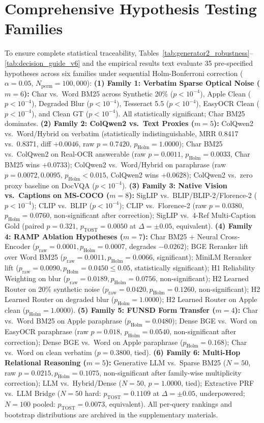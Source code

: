 \section{Comprehensive Hypothesis Testing Families}
\label{sec:appendix_holm}
{\scriptsize To ensure complete statistical traceability, Tables~\ref{tab:generator2_robustness}--\ref{tab:decision_guide_v6} and the empirical results text evaluate 35 pre-specified hypotheses across six families under sequential Holm-Bonferroni correction ($\alpha=0.05$, $N_{\text{perm}}=100{,}000$):
\textbf{(1) Family 1: Verbatim Sparse Optical Noise ($m=6$):} Char vs.\ Word BM25 across Synthetic 20\% ($p < 10^{-4}$), Apple Clean ($p < 10^{-4}$), Degraded Blur ($p < 10^{-4}$), Tesseract 5.5 ($p < 10^{-4}$), EasyOCR Clean ($p < 10^{-4}$), and Clean GT ($p < 10^{-4}$). All statistically significant; Char BM25 dominates.
\textbf{(2) Family 2: ColQwen2 vs.\ Text Proxies ($m=5$):} ColQwen2 vs.\ Word/Hybrid on verbatim (statistically indistinguishable, MRR 0.8417 vs.\ 0.8371, diff $+0.0046$, raw $p=0.7420$, $p_{\text{Holm}}=1.0000$); Char BM25 vs.\ ColQwen2 on Real-OCR answerable (raw $p=0.0011$, $p_{\text{Holm}}=0.0033$, Char BM25 wins $+0.0733$); ColQwen2 vs.\ Word/Hybrid on paraphrase (raw $p=0.0072, 0.0095$, $p_{\text{Holm}} < 0.015$, ColQwen2 wins $+0.0628$); ColQwen2 vs.\ zero proxy baseline on DocVQA ($p < 10^{-4}$).
\textbf{(3) Family 3: Native Vision vs.\ Captions on MS-COCO ($m=8$):} SigLIP vs.\ BLIP/BLIP-2/Florence-2 ($p < 10^{-4}$); CLIP vs.\ BLIP ($p < 10^{-4}$); CLIP vs.\ Florence-2 (raw $p=0.0380$, $p_{\text{Holm}}=0.0760$, non-significant after correction); SigLIP vs.\ 4-Ref Multi-Caption Gold (paired $p=0.321$, $p_{\text{TOST}}=0.0050$ at $\Delta=\pm 0.05$, equivalent).
\textbf{(4) Family 4: RAMP Ablation Hypotheses ($m=7$):} Char BM25 + Neural Cross-Encoder ($p_{\text{raw}}=0.0001, p_{\text{Holm}}=0.0007$, degrades $-0.0262$); BGE Reranker lift over Word BM25 ($p_{\text{raw}}=0.0011, p_{\text{Holm}}=0.0066$, significant); MiniLM Reranker lift ($p_{\text{raw}}=0.0090, p_{\text{Holm}}=0.0450 \le 0.05$, statistically significant); H1 Reliability Weighting on blur ($p_{\text{raw}}=0.0189, p_{\text{Holm}}=0.0756$, non-significant); H2 Learned Router on 20\% synthetic noise ($p_{\text{raw}}=0.0420, p_{\text{Holm}}=0.1260$, non-significant); H2 Learned Router on degraded blur ($p_{\text{Holm}}=1.0000$); H2 Learned Router on Apple clean ($p_{\text{Holm}}=1.0000$).
\textbf{(5) Family 5: FUNSD Form Transfer ($m=4$):} Char vs.\ Word BM25 on Apple paraphrase ($p_{\text{Holm}}=0.0480$); Dense BGE vs.\ Word on EasyOCR paraphrase (raw $p=0.018$, $p_{\text{Holm}}=0.0540$, non-significant after correction); Dense BGE vs.\ Word on Apple paraphrase ($p_{\text{Holm}}=0.168$); Char vs.\ Word on clean verbatim ($p=0.3800$, tied).
\textbf{(6) Family 6: Multi-Hop Relational Reasoning ($m=5$):} Generative LLM vs.\ Sparse BM25 ($N=50$, raw $p=0.0215, p_{\text{Holm}}=0.1075$, non-significant after family-wise multiplicity correction); LLM vs.\ Hybrid/Dense ($N=50$, $p=1.0000$, tied); Extractive PRF vs.\ LLM Bridge ($N=50$ hard: $p_{\text{TOST}}=0.1109$ at $\Delta=\pm 0.05$, underpowered; $N=100$ pooled: $p_{\text{TOST}}=0.0073$, equivalent). All per-query rankings and bootstrap distributions are archived in the supplementary materials.

}
